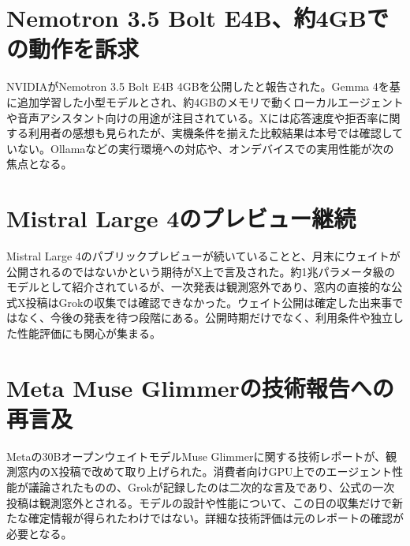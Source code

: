 \section{Nemotron 3.5 Bolt E4B、約4GBでの動作を訴求}
NVIDIAがNemotron 3.5 Bolt E4B 4GBを公開したと報告された。Gemma 4を基に追加学習した小型モデルとされ、約4GBのメモリで動くローカルエージェントや音声アシスタント向けの用途が注目されている。Xには応答速度や拒否率に関する利用者の感想も見られたが、実機条件を揃えた比較結果は本号では確認していない。Ollamaなどの実行環境への対応や、オンデバイスでの実用性能が次の焦点となる。

\section{Mistral Large 4のプレビュー継続}
Mistral Large 4のパブリックプレビューが続いていることと、月末にウェイトが公開されるのではないかという期待がX上で言及された。約1兆パラメータ級のモデルとして紹介されているが、一次発表は観測窓外であり、窓内の直接的な公式X投稿はGrokの収集では確認できなかった。ウェイト公開は確定した出来事ではなく、今後の発表を待つ段階にある。公開時期だけでなく、利用条件や独立した性能評価にも関心が集まる。

\section{Meta Muse Glimmerの技術報告への再言及}
Metaの30BオープンウェイトモデルMuse Glimmerに関する技術レポートが、観測窓内のX投稿で改めて取り上げられた。消費者向けGPU上でのエージェント性能が議論されたものの、Grokが記録したのは二次的な言及であり、公式の一次投稿は観測窓外とされる。モデルの設計や性能について、この日の収集だけで新たな確定情報が得られたわけではない。詳細な技術評価は元のレポートの確認が必要となる。
